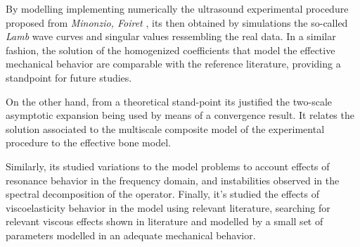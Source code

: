 \begin{intro}
By modelling implementing numerically the ultrasound experimental procedure proposed from \textit{Minonzio, Foiret} \cite{Foiret2014}, \cite{Minonzio2018} its then obtained by simulations the so-called \textit{Lamb} wave curves and singular values ressembling the real data. In a similar fashion, the solution of the homogenized coefficients that model the effective mechanical behavior are comparable with the reference literature, providing a standpoint for future studies.

On the other hand, from a theoretical stand-point its justified the two-scale asymptotic expansion being used by means of a convergence result. It relates the solution associated to the multiscale composite model of the experimental procedure to the effective bone model.

Similarly, its studied variations to the model problems to account effects of resonance behavior in the frequency domain, and instabilities observed in the spectral decomposition of the operator. 
Finally, it's studied the effects of viscoelasticity behavior in the model using relevant literature, searching for relevant viscous effects shown in literature and modelled by a small set of parameters modelled in an adequate mechanical behavior.


\end{intro}